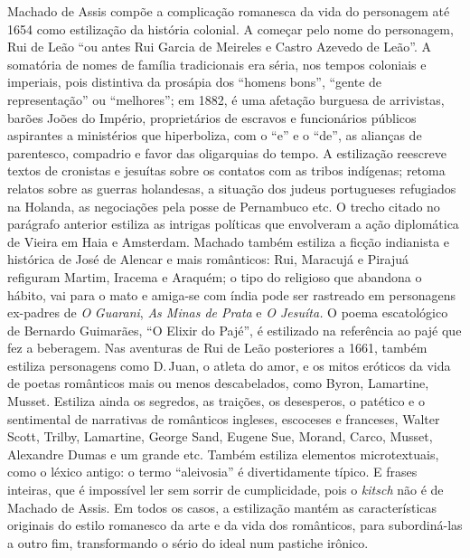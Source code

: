 Machado de Assis compõe a complicação romanesca da vida do personagem
até 1654 como estilização da história colonial. A começar pelo nome do
personagem, Rui de Leão ``ou antes Rui Garcia de Meireles e Castro
Azevedo de Leão''. A somatória de nomes de família tradicionais era
séria, nos tempos coloniais e imperiais, pois distintiva da prosápia dos
``homens bons'', ``gente de representação'' ou ``melhores''; em 1882, é uma
afetação burguesa de arrivistas, barões Joões do Império, proprietários
de escravos e funcionários públicos aspirantes a ministérios que
hiperboliza, com o ``e'' e o ``de'', as alianças de parentesco, compadrio e
favor das oligarquias do tempo. A estilização reescreve textos de
cronistas e jesuítas sobre os contatos com as tribos indígenas; retoma
relatos sobre as guerras holandesas, a situação dos judeus portugueses
refugiados na Holanda, as negociações pela posse de Pernambuco etc. O
trecho citado no parágrafo anterior estiliza as intrigas políticas que
envolveram a ação diplomática de Vieira em Haia e Amsterdam. Machado
também estiliza a ficção indianista e histórica de José de Alencar e
mais românticos: Rui, Maracujá e Pirajuá refiguram Martim, Iracema e
Araquém; o tipo do religioso que abandona o hábito, vai para o mato e
amiga-se com índia pode ser rastreado em personagens ex-padres de
\emph{O} \emph{Guarani}, \emph{As Minas de Prata} e \emph{O Jesuíta.} O
poema escatológico de Bernardo Guimarães, ``O Elixir do Pajé'', é
estilizado na referência ao pajé que fez a beberagem. Nas aventuras de
Rui de Leão posteriores a 1661, também estiliza personagens como D.\,Juan, o atleta do amor, e os mitos eróticos da vida de poetas românticos
mais ou menos descabelados, como Byron, Lamartine, Musset. Estiliza
ainda os segredos, as traições, os desesperos, o patético e o
sentimental de narrativas de românticos ingleses, escoceses e franceses,
Walter Scott, Trilby, Lamartine, George Sand, Eugene Sue, Morand, Carco,
Musset, Alexandre Dumas e um grande etc. Também estiliza elementos
microtextuais, como o léxico antigo: o termo ``aleivosia'' é
divertidamente típico. E frases inteiras, que é impossível ler sem
sorrir de cumplicidade, pois o \emph{kitsch} não é de Machado de Assis.
Em todos os casos, a estilização mantém as características originais do
estilo romanesco da arte e da vida dos românticos, para subordiná-las a
outro fim, transformando o sério do ideal num pastiche irônico.

